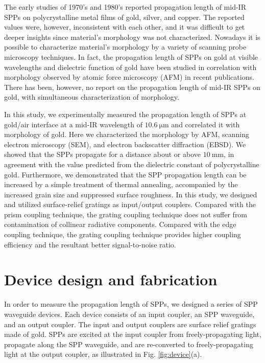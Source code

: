 \documentclass[aip,apl,reprint]{revtex4-1}
\begin{document}
The early studies of 1970's and 1980's reported propagation length of mid-IR SPPs on polycrystalline metal films of gold,\cite{McMullen, Schlesinger1, Schlesinger2} silver,\cite{Schlesinger1, Schlesinger2} and copper.\cite{Schoenwald, Shiba} The reported values were, however, inconsistent with each other, and it was difficult to get deeper insights since material's morphology was not characterized. Nowadays it is possible to characterize material's morphology by a variety of scanning probe microscopy techniques. In fact, the propagation length of SPPs on gold at visible wavelengths\cite{Kuttge} and dielectric function of gold\cite{Trollmann, Olmon} have been studied in correlation with morphology observed by atomic force microscopy (AFM) in recent publications. There has been, however, no report on the propagation length of mid-IR SPPs on gold, with simultaneous characterization of morphology.

In this study, we experimentally measured the propagation length of SPPs at gold/air interface at a mid-IR wavelength of $10.6\:\mathrm{\mu m}$ and correlated it with morphology of gold. Here we characterized the morphology by AFM, scanning electron microscopy (SEM), and electron backscatter diffraction (EBSD). We showed that the SPPs propagate for a distance about or above $10\:\mathrm{mm}$, in agreement with the value predicted from the dielectric constant of polycrystalline gold. Furthermore, we demonstrated that the SPP propagation length can be increased by a simple treatment of thermal annealing, accompanied by the increased grain size and suppressed surface roughness.
In this study, we designed and utilized surface-relief gratings as input/output couplers. Compared with the prism coupling technique,\cite{Schoenwald, Shiba} the grating coupling technique does not suffer from contamination of collinear radiative components.\cite{Schlesinger1, Schlesinger2} Compared with the edge coupling technique,\cite{Schlesinger1, Schlesinger2} the grating coupling technique provides higher coupling efficiency and the resultant better signal-to-noise ratio. 

\section{Device design and fabrication}
\label{sec:device}
In order to measure the propagation length of SPPs, we designed a series of SPP waveguide devices. Each device consists of an input coupler, an SPP waveguide, and an output coupler.  The input and output couplers are surface relief gratings made of gold. SPPs are  excited at the input coupler from freely-propagating light, propagate along the SPP waveguide, and are re-converted to freely-propagating light at the output coupler, as illustrated in Fig. \ref{fig:device}(a). 
\end{document}

